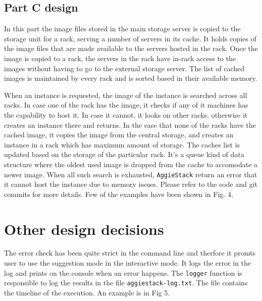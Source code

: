 \documentclass[letterpaper]{article}
\begin{document}
\subsection{Part C design}

In this part the image files stored in the main storage server is copied to the storage unit for a rack, serving a number of servers in its cache. It holds copies of the image files that are made available to the servers hosted in the rack. Once the image is copied to a rack, the servers in the rack have in-rack access to the images without having to go to the external storage server. The list of cached images is maintained by every rack and is sorted based in their available memory. 

When an instance is requested, the image of the instance is searched across all racks. In case one of the rack has the image, it checks if any of it machines has the capability to host it. In case it cannot, it looks on other racks, otherwise it creates an instance there and returns. In the case that none of the racks have the cached image, it copies the image from the central storage, and creates an instance in a rack which has maximum amount of storage. The caches list is updated based on the storage of the particular rack. It's a queue kind of data structure where the oldest used image is dropped from the cache to accomodate a newer image. When all such search is exhausted, \texttt{AggieStack} return an error that it cannot host the instance due to memory issues. Please refer to the code and git commits for more details. Few of the examples have been shown in Fig. 4. 

\section{Other design decisions}

The error check has been quite strict in the command line and therfore it promts user to use the suggestion mode in the interactive mode. It logs the error in the log and prints on the console when an error happens. The \texttt{logger} function is responsible to log the results in the file \texttt{aggiestack-log.txt}. The file contains the timeline of the execution. An example is in Fig 5. 
\end{document}
